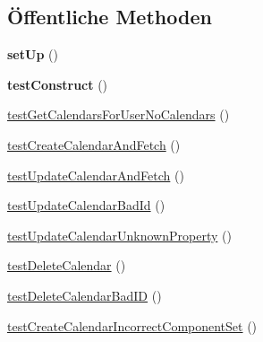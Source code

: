 \subsection*{Öffentliche Methoden}
\begin{DoxyCompactItemize}
\item 
\mbox{\label{class_sabre_1_1_cal_d_a_v_1_1_backend_1_1_abstract_p_d_o_test_aee95aa4bf70d3fc81bf1131d9a615e8f}} 
{\bfseries set\+Up} ()
\item 
\mbox{\label{class_sabre_1_1_cal_d_a_v_1_1_backend_1_1_abstract_p_d_o_test_a284c45fbe7b23b1d0e63c8770b973d95}} 
{\bfseries test\+Construct} ()
\item 
\mbox{\hyperlink{class_sabre_1_1_cal_d_a_v_1_1_backend_1_1_abstract_p_d_o_test_aa130a7b45b8569bc44d7c3f347a821cd}{test\+Get\+Calendars\+For\+User\+No\+Calendars}} ()
\item 
\mbox{\hyperlink{class_sabre_1_1_cal_d_a_v_1_1_backend_1_1_abstract_p_d_o_test_a7d9a8f10aad5eb8fee27b31cea43ffe2}{test\+Create\+Calendar\+And\+Fetch}} ()
\item 
\mbox{\hyperlink{class_sabre_1_1_cal_d_a_v_1_1_backend_1_1_abstract_p_d_o_test_ad7733506f5d62c2e4f4ed2c75b4f7254}{test\+Update\+Calendar\+And\+Fetch}} ()
\item 
\mbox{\hyperlink{class_sabre_1_1_cal_d_a_v_1_1_backend_1_1_abstract_p_d_o_test_a334118d11f85e224db66776751ddfa87}{test\+Update\+Calendar\+Bad\+Id}} ()
\item 
\mbox{\hyperlink{class_sabre_1_1_cal_d_a_v_1_1_backend_1_1_abstract_p_d_o_test_a53d04cc4eb6806ba65153762a1ae4ae2}{test\+Update\+Calendar\+Unknown\+Property}} ()
\item 
\mbox{\hyperlink{class_sabre_1_1_cal_d_a_v_1_1_backend_1_1_abstract_p_d_o_test_a47d8f99e2569ec9ef74f2b8500ab73ea}{test\+Delete\+Calendar}} ()
\item 
\mbox{\hyperlink{class_sabre_1_1_cal_d_a_v_1_1_backend_1_1_abstract_p_d_o_test_aa530184b44a3de60d5cb2a6c74a4224e}{test\+Delete\+Calendar\+Bad\+ID}} ()
\item 
\mbox{\hyperlink{class_sabre_1_1_cal_d_a_v_1_1_backend_1_1_abstract_p_d_o_test_a0cdd02b69891022f32e82407f3bbd438}{test\+Create\+Calendar\+Incorrect\+Component\+Set}} ()
\item 
\mbox{\label{class_sabre_1_1_cal_d_a_v_1_1_backend_1_1_abstract_p_d_o_test_a10744ef20f91821ba0a34d6f66be0474}} 

\end{DoxyCompactItemize}

